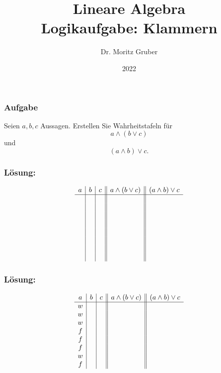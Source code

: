 

\title{Lineare Algebra\\[3mm] 
	\large Logikaufgabe: Klammern
}
\author{Dr. Moritz Gruber} 
\date{2022}



%
\begin{frame}[plain] 
 \titlepage
\end{frame}
%
%
\begin{frame} \frametitle{Aufgabe}
Seien $a,b,c$  Aussagen.
Erstellen Sie Wahrheitstafeln für 
$$
	a\land (b \lor c)
$$
und
$$
	(a\land b) \lor c.
$$
\end{frame}

\begin{frame}\frametitle{Lösung:}

$$
	\begin{array}{c | c | c || c || c}
		a	&b	&c	& a\land (b \lor c)	& (a\land b) \lor c	\\ \hline
&&&&\\
&&&&\\
&&&&\\
&&&&\\
&&&&\\
&&&&\\
&&&&\\
&&&&\\
	\end{array}
$$

\end{frame}

\begin{frame}\frametitle{Lösung:}

$$
	\begin{array}{c | c | c || c || c}
		a	&b	&c	& a\land (b \lor c)	& (a\land b) \lor c	\\ \hline
		w	&&&&		\\
		w	&&&&			\\
		w	&&&&			\\
		f	&&&&				\\
		f	&&&&				\\
		f	&&&&			\\
		w	&&&&			\\
		f	&&&&			\\
	\end{array}
$$



\end{frame}

